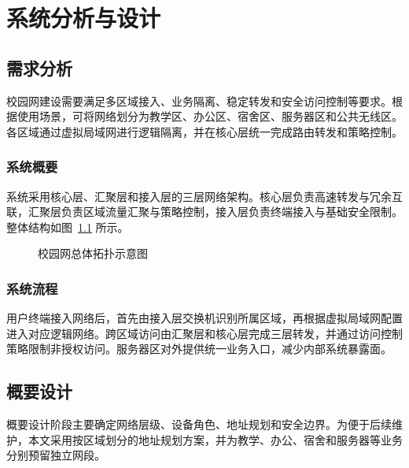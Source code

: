 \chapter{系统分析与设计}

\section{需求分析}

校园网建设需要满足多区域接入、业务隔离、稳定转发和安全访问控制等要求。根据使用场景，可将网络划分为教学区、办公区、宿舍区、服务器区和公共无线区。各区域通过虚拟局域网进行逻辑隔离，并在核心层统一完成路由转发和策略控制。

\subsection{系统概要}

系统采用核心层、汇聚层和接入层的三层网络架构。核心层负责高速转发与冗余互联，汇聚层负责区域流量汇聚与策略控制，接入层负责终端接入与基础安全限制。整体结构如图~\ref{fig:topology} 所示。

\begin{figure}[htbp]
  \centering
  \caption{校园网总体拓扑示意图}
  \label{fig:topology}
\end{figure}

\subsection{系统流程}

用户终端接入网络后，首先由接入层交换机识别所属区域，再根据虚拟局域网配置进入对应逻辑网络。跨区域访问由汇聚层和核心层完成三层转发，并通过访问控制策略限制非授权访问。服务器区对外提供统一业务入口，减少内部系统暴露面。

\section{概要设计}

概要设计阶段主要确定网络层级、设备角色、地址规划和安全边界。为便于后续维护，本文采用按区域划分的地址规划方案，并为教学、办公、宿舍和服务器等业务分别预留独立网段。

